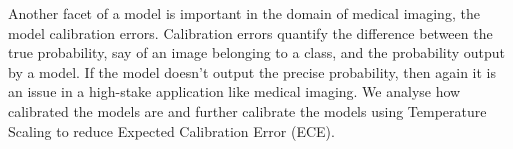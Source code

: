 Another facet of a model is important in the domain of medical imaging, the model calibration errors. Calibration errors quantify the difference between the true probability, say of an image belonging to a class, and the probability output by a model. If the model doesn't output the precise probability, then again it is an issue in a high-stake application like medical imaging. We analyse how calibrated the models are and further calibrate the models using Temperature Scaling to reduce Expected Calibration Error (ECE).




